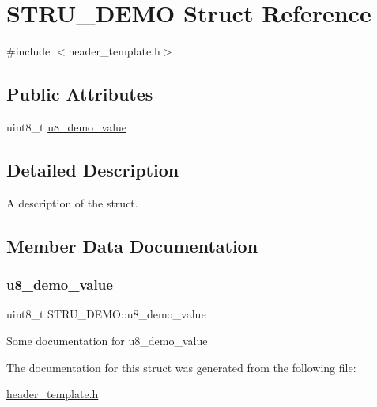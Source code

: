 \hypertarget{struct_s_t_r_u___d_e_m_o}{}\section{S\+T\+R\+U\+\_\+\+D\+E\+MO Struct Reference}
\label{struct_s_t_r_u___d_e_m_o}


{\ttfamily \#include $<$header\+\_\+template.\+h$>$}

\subsection*{Public Attributes}
\begin{DoxyCompactItemize}
\item 
uint8\+\_\+t \hyperlink{struct_s_t_r_u___d_e_m_o_a79ae9788d6fe743339242fc3369a482e}{u8\+\_\+demo\+\_\+value}
\end{DoxyCompactItemize}


\subsection{Detailed Description}
A description of the struct. 

\subsection{Member Data Documentation}
\mbox{\label{struct_s_t_r_u___d_e_m_o_a79ae9788d6fe743339242fc3369a482e}} 
\subsubsection{\texorpdfstring{u8\+\_\+demo\+\_\+value}{u8\_demo\_value}}
{\footnotesize\ttfamily uint8\+\_\+t S\+T\+R\+U\+\_\+\+D\+E\+M\+O\+::u8\+\_\+demo\+\_\+value}

Some documentation for u8\+\_\+demo\+\_\+value 

The documentation for this struct was generated from the following file\+:\begin{DoxyCompactItemize}
\item 
\hyperlink{header__template_8h}{header\+\_\+template.\+h}\end{DoxyCompactItemize}

